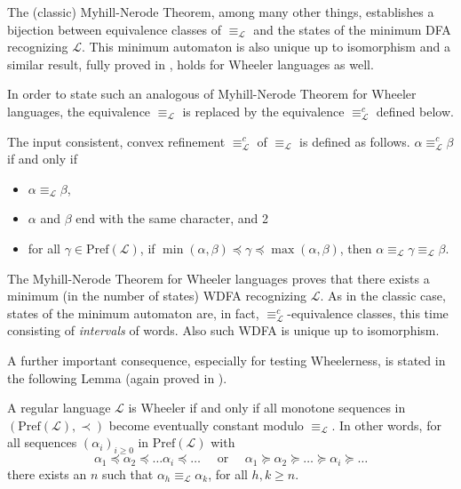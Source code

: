 \documentclass[runningheads]{llncs}
\newcommand{\pf}[1]{\text{Pref}(\mathcal #1)}
\begin{document}
The (classic) Myhill-Nerode Theorem, among many other things, establishes a bijection between equivalence classes of $\equiv_\mathcal L$ and the states of the minimum DFA recognizing $\mathcal L$. This minimum automaton is also unique up to isomorphism and a similar result, fully proved in \cite{ADPP2}, holds for Wheeler languages as well. 

In order to state such an analogous of Myhill-Nerode Theorem for  Wheeler languages, the equivalence $\equiv_\mathcal L$ is replaced by the equivalence $\equiv_\mathcal L^c$ defined below.

\begin{definition}
The input consistent, convex refinement $\equiv_\mathcal L^c$ of $\equiv_\mathcal L$ is defined as follows. $\alpha \equiv_\mathcal L^c \beta$ if and only if
\begin{itemize}
    \item $\alpha \equiv_\mathcal L \beta$,
    \item $\alpha$ and $\beta$ end with the same character, and 
2

    \item for all $\gamma \in \pf L$, if $\min(\alpha, \beta) \preceq \gamma \preceq \max(\alpha,\beta)$, then $\alpha \equiv_\mathcal L\gamma \equiv_\mathcal L \beta$.
\end{itemize}
\end{definition}

The  Myhill-Nerode Theorem for Wheeler languages proves that there exists a minimum (in the number of states) WDFA recognizing $\mathcal L$. As in the classic case,  states of the minimum automaton are, in fact, $\equiv_\mathcal L^c$-equivalence classes, this time consisting of \emph{intervals} of words. Also such WDFA is unique up to isomorphism.   

A further important consequence, especially for testing Wheelerness, is stated in the following Lemma (again proved in \cite{ADPP2}).

\begin{lemma}
\label{monotone}
A regular language $\mathcal L$ is Wheeler if and only if all monotone sequences in $(\pf L, \prec)$ become eventually constant modulo $\equiv_\mathcal L$. In other words, for all sequences $(\alpha_i)_{i \ge 0}$ in $\pf L$ with
\[
\alpha_1 \preceq \alpha_2 \preceq \dots \alpha_i \preceq \dots \quad \text{ or }\quad \alpha_1 \succeq \alpha_2 \succeq \dots \succeq \alpha_i \succeq \dots
\]
there exists an $n$ such that $\alpha_h \equiv_\mathcal L \alpha_k$, for all $h,k \ge n$. 
\end{lemma}
\end{document}
